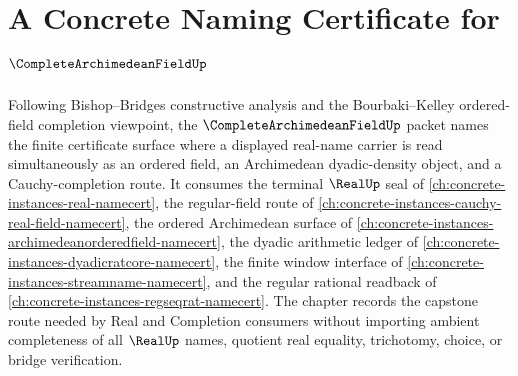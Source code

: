 \chapter{A Concrete Naming Certificate for $\CompleteArchimedeanFieldUp$}
\label{ch:concrete-instances-complete-archimedean-field-namecert}

Following Bishop--Bridges constructive analysis and the Bourbaki--Kelley ordered-field completion viewpoint, the $\CompleteArchimedeanFieldUp$ packet names the finite certificate surface where a displayed real-name carrier is read simultaneously as an ordered field, an Archimedean dyadic-density object, and a Cauchy-completion route. It consumes the terminal $\RealUp$ seal of \autoref{ch:concrete-instances-real-namecert}, the regular-field route of \autoref{ch:concrete-instances-cauchy-real-field-namecert}, the ordered Archimedean surface of \autoref{ch:concrete-instances-archimedeanorderedfield-namecert}, the dyadic arithmetic ledger of \autoref{ch:concrete-instances-dyadicratcore-namecert}, the finite window interface of \autoref{ch:concrete-instances-streamname-namecert}, and the regular rational readback of \autoref{ch:concrete-instances-regseqrat-namecert}. The chapter records the capstone route needed by Real and Completion consumers without importing ambient completeness of all $\RealUp$ names, quotient real equality, trichotomy, choice, or bridge verification.

